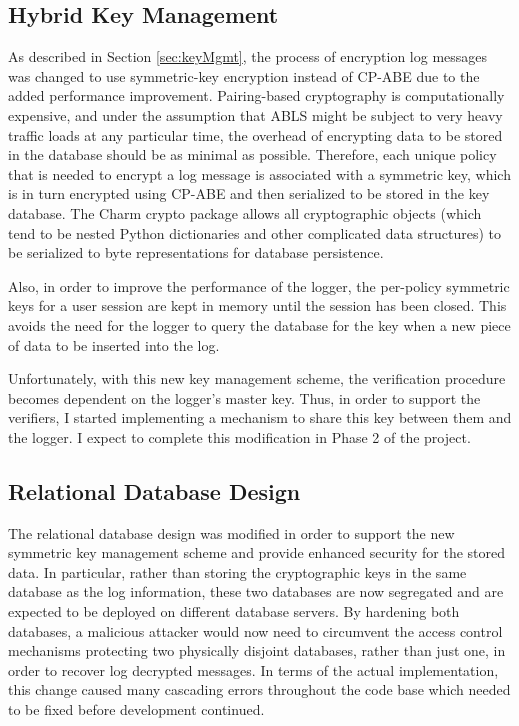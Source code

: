 \documentclass{sig-alternate}
\begin{document}
\subsection{Hybrid Key Management}
As described in Section \ref{sec:keyMgmt}, the process of encryption log messages was changed to use symmetric-key
encryption instead of CP-ABE due to the added performance improvement. Pairing-based cryptography is computationally
expensive, and under the assumption that ABLS might be subject to very heavy traffic loads at any particular time, the 
overhead of encrypting data to be stored in the database should be as minimal as possible. Therefore, each unique
policy that is needed to encrypt a log message is associated with a symmetric key, which is in turn encrypted using 
CP-ABE and then serialized to be stored in the key database. The Charm crypto package allows all cryptographic 
objects (which tend to be nested Python dictionaries and other complicated data structures) to be serialized to byte 
representations for database persistence. 

Also, in order to improve the performance of the logger, the per-policy symmetric keys for a user session are kept
in memory until the session has been closed. This avoids the need for the logger to query the database for the key 
when a new piece of data to be inserted into the log. 

Unfortunately, with this new key management scheme, the verification procedure becomes dependent on the
logger's master key. Thus, in order to support the verifiers, I started implementing a mechanism to share this key 
between them and the logger. I expect to complete this modification in Phase 2 of the project.

\subsection{Relational Database Design}
The relational database design was modified in order to support the new symmetric key management scheme and provide 
enhanced security for the stored data. In particular, rather than storing the cryptographic keys in the same database as the
log information, these two databases are now segregated and are expected to be deployed on different database servers.
By hardening both databases, a malicious attacker would now need to circumvent the access control 
mechanisms protecting two physically disjoint databases, rather than just one, in order to recover log 
decrypted messages. In terms of the actual implementation, this change caused many cascading errors 
throughout the code base which needed to be fixed before development continued.
\end{document}
